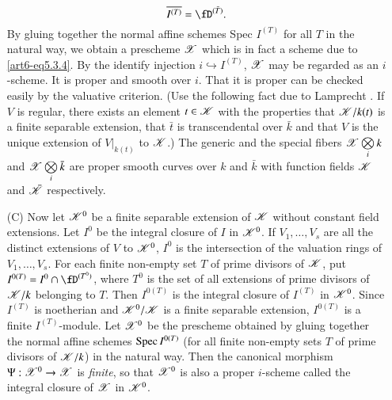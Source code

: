 \begin{itemize}
\begin{equation}
\overline{I^{(T)}} = \fD^{(\bar{T})}. \label{art6-eq5.3.5}
\end{equation}
By gluing together the normal affine schemes Spec $I^{(T)}$ for all $T$ in the natural way, we obtain a prescheme $\mathscr{X}$ which is in fact a scheme due to \eqref{art6-eq5.3.4}. By the identify injection $i \hookrightarrow I^{(T)}$, $\mathscr{X}$ may be regarded as an $i$-scheme. It is proper and smooth over $i$. That it is proper can be checked easily by the valuative criterion. (Use the following fact due to Lamprecht \cite{art6key11}. If $V$ is regular, there exists an element $t \in \mathscr{K}$ with the properties that $\mathscr{K} / k (t)$ is a finite separable extension, that $\bar{t}$ is transcendental over $\bar{k}$ and that $V$ is the unique extension of $V |_{k(t)}$ to $\mathscr{K}$.) The generic and the special fibers $\mathscr{X} \bigotimes\limits_i k$ and $\mathscr{X} \bigotimes\limits_i \bar{k}$ are proper smooth curves over $k$ and $\bar{k}$ with function fields $\mathscr{K}$ and $\bar{\mathscr{K}}$ respectively.

\item[(C)] Now let $\mathscr{K}^0$ be a finite separable extension of $\mathscr{K}$ without constant field extensions. Let $I^0$ be the integral closure of $I$ in $\mathscr{K}^0$. If $V_1,\ldots, V_s$ are all the distinct extensions of $V$ to $\mathscr{K}^0$, $I^0$ is the intersection of the valuation rings of $V_1, \ldots, V_s$. For each finite non-empty set $T$ of prime divisors of $\mathscr{K}$, put $I^{0(T)} = I^0 \cap \fD^{(T^0)}$, where $T^0$ is the set of all extensions of prime divisors of $\mathscr{K}/k$ belonging to $T$. Then $I^{0(T)}$ is the integral closure of $I^{(T)}$ in $\mathscr{K}^0$. Since $I^{(T)}$ is noetherian and $\mathscr{K}^0/ \mathscr{K}$ is a finite separable extension, $I^{0(T)}$ is a finite $I^{(T)}$-module. Let $\mathscr{X}^0$ be the prescheme obtained by gluing together the normal affine schemes $\operatorname{Spec} I^{0(T)}$ (for all finite non-empty sets $T$ of prime divisors of $\mathscr{K}/k$) in the natural way. Then the canonical morphism $\Psi : \mathscr{X}^0 \to \mathscr{X}$ is \textit{finite}, so that $\mathscr{X}^0$ is also a proper $i$-scheme called the integral closure of $\mathscr{X}$ in $\mathscr{K}^0$. 


\end{itemize}
